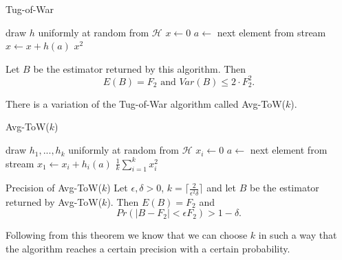 \documentclass{panikzettel}
\begin{document}
\begin{halfboxl}
\vspace{-\baselineskip}
\begin{algo}{Tug-of-War}
{
\begin{algorithmic}[1]
  \State draw $h$ uniformly at random from $\mathcal{H}$
  \State $x\leftarrow 0$
    \State $a\leftarrow $ next element from stream
    \State $x\leftarrow x + h(a)$
  \EndWhile
  \State \Return $x^2$
\end{algorithmic}
}
\end{algo}
\end{halfboxl}
\begin{halfboxr}
\vspace{-\baselineskip}
Let $B$ be the estimator returned by this algorithm. Then
\[
E(B)=F_2 \text{ and } Var(B)\leq 2\cdot F_2^2.
\]
\end{halfboxr}

There is a variation of the Tug-of-War algorithm called Avg-ToW($k$).

\begin{halfboxl}
\vspace{-\baselineskip}
	\begin{algo}{Avg-ToW($k$)}
	{
	\begin{algorithmic}[1]
	  \State draw $h_1,...,h_k$ uniformly at random from $\mathcal{H}$
	    \State $x_i\leftarrow 0$
	  \EndFor
	    \State $a\leftarrow $ next element from stream
	      \State $x_1\leftarrow x_i + h_i(a)$
	    \EndFor
	  \EndWhile
	  \State \Return $\frac{1}{k}\sum_{i=1}^k x_i^2$
	\end{algorithmic}
	}
	\end{algo}
\end{halfboxl}
\begin{halfboxr}
\vspace{-\baselineskip}
\begin{theo}{Precision of Avg-ToW($k$)}
Let $\epsilon,\delta>0$, $k= \lceil \frac{2}{\epsilon^2\delta} \rceil$ and let $B$ be the estimator returned by Avg-ToW($k$). Then $E(B)=F_2$ and
\[
Pr(|B-F_2| < \epsilon F_2)>1-\delta.
\]
\end{theo}
Following from this theorem we know that we can choose $k$ in such a way that the algorithm reaches a certain precision with a certain probability.
\end{halfboxr}
\end{document}
